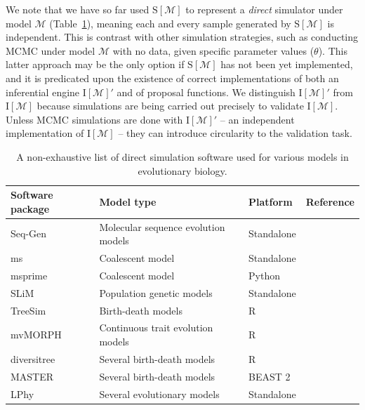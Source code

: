 \documentclass[oneside]{article}
\begin{document}
We note that we have so far used $\text{S}[\mathcal{M}]$ to represent a \emph{direct} simulator under model $\mathcal{M}$ (Table~\ref{tab:sim}), meaning each and every sample generated by $\text{S}[\mathcal{M}]$ is independent.
This is contrast with other simulation strategies, such as conducting MCMC under model $\mathcal{M}$ with no data, given specific parameter values ($\theta$).
This latter approach may be the only option if $\text{S}[\mathcal{M}]$ has not been yet implemented, and it is predicated upon the existence of correct implementations of both an inferential engine $\text{I}[\mathcal{M}]'$ and of proposal functions.
We distinguish $\text{I}[\mathcal{M}]'$ from $\text{I}[\mathcal{M}]$ because simulations are being carried out precisely to validate $\text{I}[\mathcal{M}]$.
Unless MCMC simulations are done with $\text{I}[\mathcal{M}]'$ -- an independent implementation of $\text{I}[\mathcal{M}]$ -- they can introduce circularity to the validation task.

\begin{center}
  \begin{table}[h]
  \caption{A non-exhaustive list of direct simulation software used for various models in evolutionary biology.}
  \label{tab:sim}
  \centering
  \begin{tabular}{ p{0.7in} p{1.5in} p{1in} p{1.3in} }
    \hline
    Software package & Model type & Platform & Reference \\
    \hline  
    \rowcolor{gray!10}Seq-Gen & Molecular sequence evolution models & Standalone & \citealp{rambaut97} \\
    ms & Coalescent model & Standalone & \citealp{hudson02}\\
    \rowcolor{gray!10}msprime & Coalescent model & Python & \citealp{kelleher16}\\
    SLiM & Population genetic models & Standalone & \citealp{haller19}\\    
    \rowcolor{gray!10}TreeSim & Birth-death models & R & \citealp{stadler11}\\
    mvMORPH & Continuous trait evolution models & R & \citealp{clavel15}\\
    \rowcolor{gray!10}diversitree & Several birth-death models & R & \citealp{fitzjohn12}\\
    MASTER & Several birth-death models & BEAST 2 & \citealp{vaughan13}\\
    \rowcolor{gray!10}LPhy & Several evolutionary models & Standalone & \citealp{drummond23}\\ 
    \hline
  \end{tabular}
  \end{table}
\end{center}
\end{document}

